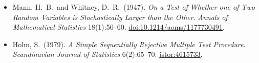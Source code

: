 \documentclass[11pt,a4paper]{article}
\begin{document}
\begin{itemize}
{    Neural Information Processing Systems} 30 (NeurIPS 2017).
    \href{https://arxiv.org/abs/1705.07874}{arXiv:1705.07874} \textbullet{}
    \href{https://papers.nips.cc/paper/2017/hash/8a20a8621978632d76c43dfd28b67767-Abstract.html}
    {NeurIPS proceedings}.
    \item Mann, H.~B.\ and Whitney, D.~R.\ (1947). \emph{On a Test of
    Whether one of Two Random Variables is Stochastically Larger than
    the Other}. \emph{Annals of Mathematical Statistics}
    18(1):50--60.
    \href{https://doi.org/10.1214/aoms/1177730491}
    {doi:10.1214/aoms/1177730491}.
    \item Holm, S.\ (1979). \emph{A Simple Sequentially Rejective
    Multiple Test Procedure}. \emph{Scandinavian Journal of
    Statistics} 6(2):65--70.
    \href{https://www.jstor.org/stable/4615733}{jstor:4615733}.
\end{itemize}
\end{document}
